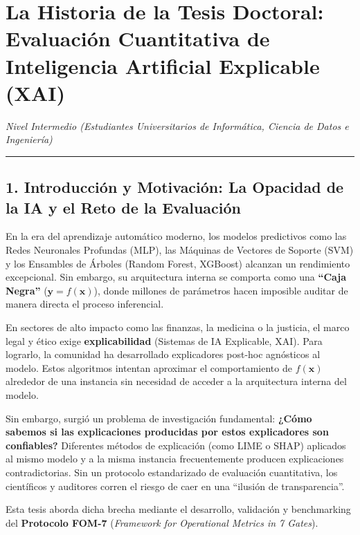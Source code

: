 \documentclass[
]{article}
\author{}
\date{}
\begin{document}
\section{La Historia de la Tesis Doctoral: Evaluación Cuantitativa de
Inteligencia Artificial Explicable
(XAI)}\label{la-historia-de-la-tesis-doctoral-evaluaciuxf3n-cuantitativa-de-inteligencia-artificial-explicable-xai}

\emph{Nivel Intermedio (Estudiantes Universitarios de Informática,
Ciencia de Datos e Ingeniería)}

\begin{center}\rule{0.5\linewidth}{0.5pt}\end{center}

\subsection{1. Introducción y Motivación: La Opacidad de la IA y el Reto
de la
Evaluación}\label{introducciuxf3n-y-motivaciuxf3n-la-opacidad-de-la-ia-y-el-reto-de-la-evaluaciuxf3n}

En la era del aprendizaje automático moderno, los modelos predictivos
como las Redes Neuronales Profundas (MLP), las Máquinas de Vectores de
Soporte (SVM) y los Ensambles de Árboles (Random Forest, XGBoost)
alcanzan un rendimiento excepcional. Sin embargo, su arquitectura
interna se comporta como una \textbf{``Caja Negra''}
(\(\mathbf{y} = f(\mathbf{x})\)), donde millones de parámetros hacen
imposible auditar de manera directa el proceso inferencial.

En sectores de alto impacto como las finanzas, la medicina o la
justicia, el marco legal y ético exige \textbf{explicabilidad} (Sistemas
de IA Explicable, XAI). Para lograrlo, la comunidad ha desarrollado
explicadores post-hoc agnósticos al modelo. Estos algoritmos intentan
aproximar el comportamiento de \(f(\mathbf{x})\) alrededor de una
instancia sin necesidad de acceder a la arquitectura interna del modelo.

Sin embargo, surgió un problema de investigación fundamental:
\textbf{¿Cómo sabemos si las explicaciones producidas por estos
explicadores son confiables?} Diferentes métodos de explicación (como
LIME o SHAP) aplicados al mismo modelo y a la misma instancia
frecuentemente producen explicaciones contradictorias. Sin un protocolo
estandarizado de evaluación cuantitativa, los científicos y auditores
corren el riesgo de caer en una ``ilusión de transparencia''.

Esta tesis aborda dicha brecha mediante el desarrollo, validación y
benchmarking del \textbf{Protocolo FOM-7} (\emph{Framework for
Operational Metrics in 7 Gates}).
\end{document}
